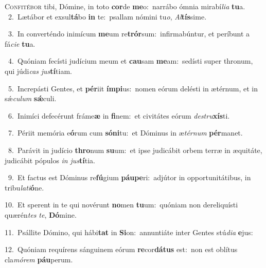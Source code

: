 \lettrine{\initial\textcolor{\initialcolor}{C}}{onfitébor} tibi, Dómine, in toto \textbf{cor}\-de \textbf{me}\-o:~\star narrábo ómnia mirabí\-\textit{li}\-\textit{a} \textbf{tu}\-a.\\
{\numbfont\textcolor{\numbcolor}{~2.}}~Lætábor et exsul\-\textbf{tá}\-bo \textbf{in} te:~\star psallam nómini tu\-\textit{o}\-, \textit{Al}\-\textbf{tís}sime.\par
{\numbfont\textcolor{\numbcolor}{~3.}}~In converténdo inimícum \textbf{me}\-um re\-\textbf{trór}\-sum:~\star infirmabúntur, et períbunt a fá\-\textit{ci}\-\textit{e} \textbf{tu}\-a.\par
{\numbfont\textcolor{\numbcolor}{~4.}}~Quóniam fecísti judícium meum et \textbf{cau}\-sam \textbf{me}\-am:~\star sedísti super thronum, qui júdi\textit{cas} \textit{jus}\-\textbf{tí}tiam.\par
{\numbfont\textcolor{\numbcolor}{~5.}}~Increpásti Gentes, et \textbf{pér}\-iit \textbf{ím}\-\textbf{pi}us:~\star nomen eórum delésti in ætérnum, et in sǽ\-\textit{cu}\-\textit{lum} \textbf{sǽ}\-culi.\par
{\numbfont\textcolor{\numbcolor}{~6.}}~Inimíci defecérunt fráme\textbf{æ} in \textbf{fi}\-nem:~\star et civitátes eórum \textit{de}\-\textit{stru}\textbf{xís}ti.\par
{\numbfont\textcolor{\numbcolor}{~7.}}~Périit memória e\-\textbf{ó}\-rum cum \textbf{só}\-\textbf{ni}tu:~\star et Dóminus in æ\-\textit{tér}\-\textit{num} \textbf{pér}\-manet.\par
{\numbfont\textcolor{\numbcolor}{~8.}}~Parávit in judício \textbf{thro}\-num \textbf{su}\-um:~\star et ipse judicábit orbem terræ in æquitáte, judicábit pópulos \textit{in} \textit{jus}\-\textbf{tí}tia.\par
{\numbfont\textcolor{\numbcolor}{~9.}}~Et factus est Dóminus re\-\textbf{fú}\-gium \textbf{páu}\-\textbf{pe}ri:~\star adjútor in opportunitátibus, in tribu\-\textit{la}\-\textit{ti}\textbf{ó}ne.\par
{\numbfont\textcolor{\numbcolor}{10.}}~Et sperent in te qui novérunt \textbf{no}\-men \textbf{tu}\-um:~\star quóniam non dereliquísti quærén\textit{tes} \textit{te}\-, \textbf{Dó}\-mine.\par
{\numbfont\textcolor{\numbcolor}{11.}}~Psállite Dómino, qui hábi\textbf{tat} in \textbf{Si}\-on:~\star annuntiáte inter Gentes stú\-\textit{di}\-\textit{a} \textbf{e}\-jus:\par
{\numbfont\textcolor{\numbcolor}{12.}}~Quóniam requírens sánguinem eórum \textbf{re}\-cor\-\textbf{dá}\-\textbf{tus} est:~\star non est oblítus cla\-\textit{mó}\-\textit{rem} \textbf{páu}\-perum.\par
